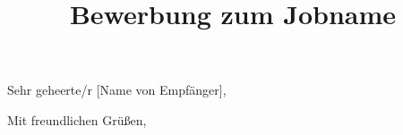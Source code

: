 \documentclass{anschreiben}
\title{Bewerbung zum Jobname}
\begin{document}
\maketitle

Sehr geheerte/r [Name von Empfänger],


\vspace{2em} %

\noindent
Mit freundlichen Grüßen,\\
\name
\end{document}
